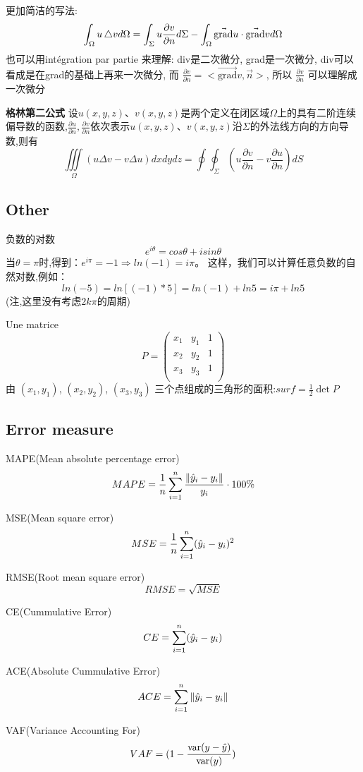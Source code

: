 \documentclass{article}
\begin{document}
更加简洁的写法:
$$
\int_{\Omega}u \mathop{}\!\mathbin\bigtriangleup v d\Omega = \int_{\Sigma}u \frac{\partial v}{\partial n}d\Sigma - \int_{\Omega} \vec{\mbox{grad}}u \cdot \vec{\mbox{grad}} v d\Omega
$$
也可以用int\'egration par partie 来理解:
div是二次微分, grad是一次微分, div可以看成是在grad的基础上再来一次微分, 而
$ \frac{\partial  v}{\partial n} = <\vec{\mbox{grad}} v,\vec{n}>$, 所以
$\frac{\partial  v}{\partial n}$ 可以理解成一次微分

\bigskip
\textbf{格林第二公式}
设$u(x,y,z)$、$v(x,y,z)$是两个定义在闭区域$\Omega$上的具有二阶连续偏导数的函数,$\frac{\partial u}{\partial n},\frac{\partial v}{\partial n}$依次表示$u(x,y,z)$、$v(x,y,z)$沿$\Sigma$的外法线方向的方向导数,则有
$$\iiint\limits_{\Omega}(u\Delta v - v\Delta u)dxdydz=\oint\!\oint_{\Sigma}(u \frac{\partial v}{\partial n}-v\frac{\partial u}{\partial n})dS$$

\subsection{Other}
负数的对数
$$e^{i\theta}=cos\theta+isin\theta$$
当$\theta=\pi$时,得到：$e^{i\pi}=-1\Rightarrow ln(-1)=i\pi$。
这样，我们可以计算任意负数的自然对数,例如：
$$ln(-5)=ln[(-1)*5]=ln(-1)+ln5=i\pi+ln5$$
(注,这里没有考虑$2k\pi$的周期)

Une matrice
$$
P=
\left(
             \begin{array}{ccc}
               x_1 & y_1 & 1 \\
               x_2 & y_2 & 1 \\
               x_3 & y_3 & 1 \\
             \end{array}
          \right)
$$
由 $(x_1,y_1)$, $(x_2,y_2)$, $(x_3,y_3)$ 三个点组成的三角形的面积:$surf = \frac{1}{2}\det{P}$

\subsection{Error measure}
MAPE(Mean absolute percentage error)
$$ MAPE = \dfrac{1}{n} \sum_{i=1}^n \dfrac{\left\Vert \hat{y}_i - y_i\right\Vert}{y_i} \cdot 100\%$$

MSE(Mean square error)
$$MSE = \dfrac{1}{n} \sum_{i=1}^n (\hat{y}_i - y_i)^2$$

RMSE(Root mean square error)
$$RMSE  = \sqrt{MSE}$$

CE(Cummulative Error)
$$CE = \sum_{i=1}^n (\hat{y}_i - y_i)$$

ACE(Absolute Cummulative Error)
$$ACE = \sum_{i=1}^n \left\Vert \hat{y}_i - y_i\right\Vert$$

VAF(Variance Accounting For)
$$VAF = (1 - \dfrac{\operatorname{var}(y - \hat{y})}{\operatorname{var}(y)})$$
\end{document}
